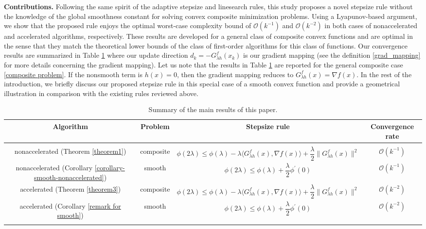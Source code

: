 \documentclass[11pt, a4paper, oneside, reqno]{amsart}
\begin{document}
\textbf{Contributions.} Following the same spirit of the adaptive stepsize and linesearch rules, this study proposes a novel stepsize rule without the knowledge of the global smoothness constant for solving convex composite minimization problems. Using a Lyapunov-based argument, we show that the proposed rule enjoys the optimal worst-case complexity bound of $\mathcal{O}(k^{-1})$ and $\mathcal{O}(k^{-2})$ in both cases of nonaccelerated and accelerated algorithms, respectively. These results are developed for a general class of composite convex functions and are optimal in the sense that they match the theoretical lower bounds of the class of first-order algorithms for this class of functions. Our convergence results are summarized in Table \ref{table1} where our update direction $d_k = -G^{f}_{\lambda h}(x_k)$ is our gradient mapping (see the definition \eqref{grad_mapping} for more details concerning the gradient mapping). Let us note that the results in Table \ref{table1} are reported for the general composite case \eqref{composite problem}. If the nonsmooth term is $h(x) = 0$, then the gradient mapping reduces to $G^{f}_{\lambda h}(x) = \nabla f(x)$. In the rest of the introduction, we briefly discuss our proposed stepsize rule in this special case of a smooth convex function and provide a geometrical illustration in comparison with the existing rules reviewed above. 
        \begin{table}[H]
           \centering
           \caption{Summary of the main results of this paper.}
           \small
           \begin{tabular}{c c c c}\hline
         {Algorithm} & {Problem} & {Stepsize rule} & {Convergence rate}\\
           \hline & \\[-1.0em]
            nonaccelerated (Theorem \ref{theorem1}) & composite & $\phi(2\lambda) \leq \phi(\lambda) - \lambda \langle G^{f}_{\lambda h}(x), \nabla f(x) \rangle + \dfrac{\lambda}{2}\|G^{f}_{\lambda h}(x)\|^2$ & $\mathcal{O}(k^{-1})$\\
            nonaccelerated (Corollary \ref{corollary-smooth-nonaccelerated}) & smooth & $\phi(2\lambda) \leq \phi(\lambda) + \dfrac{\lambda}{2}\phi^\prime(0)$ & $\mathcal{O}(k^{-1})$\\
            accelerated (Theorem \ref{theorem3}) & composite & $\phi(2\lambda) \leq \phi(\lambda) - \lambda \langle G^{f}_{\lambda h}(x), \nabla f(x) \rangle + \dfrac{\lambda}{2}\|G^{f}_{\lambda h}(x)\|^2$ & $\mathcal{O}(k^{-2})$\\
            accelerated (Corollary \ref{remark for smooth}) & smooth & $\phi(2\lambda) \leq \phi(\lambda) + \dfrac{\lambda}{2}\phi^\prime(0)$ & $\mathcal{O}(k^{-2})$\\
            \\[-1.0em]
            \hline
           \end{tabular}
           \label{table1}
       \end{table}    
\end{document}
